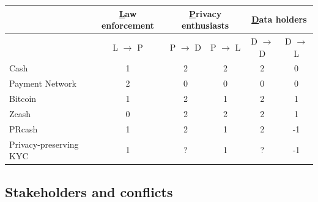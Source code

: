 \documentclass[runningheads]{llncs}
\begin{document}
\begin{table}[]
	\begin{tabular}{|l|c|c|c|c|c|}
		\hline
		&\underline{L}aw enforcement& \multicolumn{2}{c|}{\underline{P}rivacy enthusiasts} & \multicolumn{2}{c|}{\underline{D}ata holders} \\ \hline
		&    L $\rightarrow$ P   &       P $\rightarrow$ D        &      P $\rightarrow$ L        &      D $\rightarrow$ D        &     D $\rightarrow$ L          \\ \hline
		Cash 	& 1 &     2    &   2   &      2    &       0    \\ \hline
		Payment Network	& 2 &      0     &     0      &      0     &      0     \\ \hline
		Bitcoin	&  1   &  2      &    1     &     2      &   1        \\ \hline
		Zcash	& 0 &   2        &  2     &  2     &     1      \\ \hline
		PRcash~\cite{WKCC18}		& 1&    2        &   1   &   2     &     -1      \\ \hline
		Privacy-preserving KYC~\cite{BKT18} 	& 1 &    ?     &    1      &      ?     &   -1        \\ \hline
	\end{tabular}
\end{table}
 
 \subsection{Stakeholders and conflicts}
\end{document}
